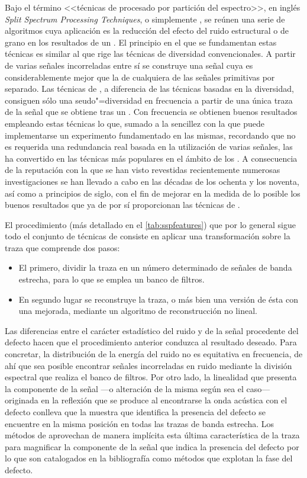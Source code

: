Bajo el término <<técnicas de procesado por partición del espectro>>, en
inglés \emph{Split Spectrum Processing Techniques}, o simplemente
, se reúnen una serie de algoritmos cuya aplicación es la
reducción del efecto del ruido estructural o de grano en los resultados de
un . El principio en el que se fundamentan estas técnicas es
similar al que rige las técnicas de diversidad convencionales. A partir de
varias señales incorreladas entre sí se construye una señal cuya 
es considerablemente mejor que la  de cualquiera de las señales
primitivas por separado. Las técnicas de , a diferencia de las
técnicas basadas en la diversidad, consiguen sólo una seudo"=diversidad en
frecuencia a partir de una única traza de la señal que se obtiene tras un
. Con frecuencia se obtienen buenos resultados empleando estas
técnicas lo que, sumado a la sencillez con la que puede implementarse un
experimento fundamentado en las mismas, recordando que no es requerida una
redundancia real basada en la utilización de varias señales, las ha
convertido en las técnicas más populares en el ámbito de los . A
consecuencia de la reputación con la que se han visto revestidas
recientemente numerosas investigaciones se han llevado a cabo en las
décadas de los ochenta y los noventa, así como a principios de siglo, con
el fin de mejorar en la medida de lo posible los buenos resultados que ya
de por sí proporcionan las técnicas de .

El procedimiento (más detallado en el \cref{tab:sspfeatures}) que por lo
general sigue todo el conjunto de técnicas de  consiste en aplicar
una transformación sobre la traza que comprende dos pasos:

\begin{itemize}
	\item El primero, dividir la traza en un número determinado de
		señales de banda estrecha, para lo que se emplea un banco
		de filtros.
	\item En segundo lugar se reconstruye la traza, o más bien una
		versión de ésta con una  mejorada, mediante un
		algoritmo de reconstrucción no lineal.
\end{itemize}

Las diferencias entre el carácter estadístico del ruido y de la señal
procedente del defecto hacen que el procedimiento anterior conduzca al
resultado deseado. Para concretar, la distribución de la energía del ruido
no es equitativa en frecuencia, de ahí que sea posible encontrar señales
incorreladas en ruido mediante la división espectral que realiza el banco
de filtros. Por otro lado, la linealidad que presenta la componente de la
señal ---o alteración de la misma según sea el caso--- originada en la
reflexión que se produce al encontrarse la onda acústica con el defecto
conlleva que la muestra que identifica la presencia del defecto se
encuentre en la misma posición en todas las trazas de banda estrecha. Los
métodos de  aprovechan de manera implícita esta última
característica de la traza para magnificar la componente de la señal que
indica la presencia del defecto por lo que son catalogados en la
bibliografía como métodos que explotan la fase del defecto.


